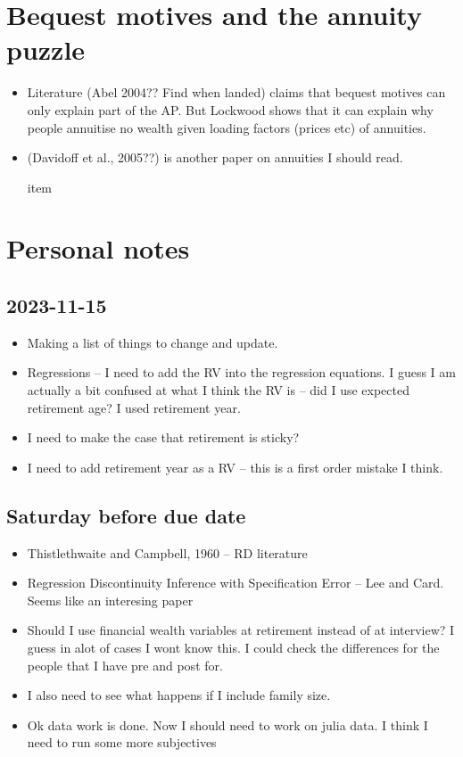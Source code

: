 \documentclass[12pt]{article}
\begin{document}
\section{Bequest motives and the annuity puzzle}
\begin{itemize}
      \item Literature (Abel 2004?? Find when landed) claims that bequest motives
            can only explain part of the AP. But Lockwood shows that it can explain why people
            annuitise no wealth given loading factors (prices etc) of annuities.

      \item  (Davidoff et al., 2005??) is another paper on annuities I should read.

            item
\end{itemize}




\section{Personal notes}

\subsection{2023-11-15}
\begin{itemize}
      \item Making a list of things to change and update.
      \item Regressions -- I need to add the RV into the regression equations. I
            guess I am actually a bit confused at what I think the RV is -- did I use
            expected retirement age? I used retirement year.

      \item I need to make the case that retirement is sticky?
      \item I need to add retirement year as a RV -- this is a first order
            mistake I think.
\end{itemize}

\subsection{Saturday before due date}
\begin{itemize}
      \item Thistlethwaite and Campbell, 1960 -- RD literature
      \item Regression Discontinuity Inference with Specification Error -- Lee and Card. Seems like an interesing paper
      \item Should I use financial wealth variables at retirement instead of at interview? I guess in alot of cases I wont
            know this. I could check the differences for the people that I have pre and post for.
      \item I also need to see what happens if I include family size.
      \item Ok data work is done. Now I should need to work on julia data. I think I need to run some more subjectives
\end{itemize}
\end{document}
